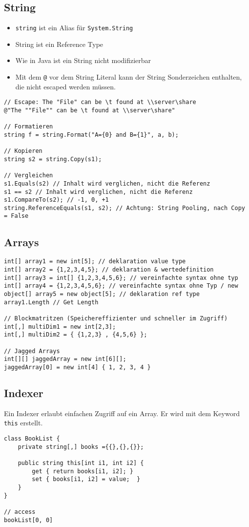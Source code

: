\subsection{String}
\begin{itemize}
	\item \lstinline|string| ist ein Alias für \lstinline|System.String|
	\item String ist ein Reference Type
	\item Wie in Java ist ein String nicht modifizierbar
	\item Mit dem \lstinline|@| vor dem String Literal kann der String Sonderzeichen enthalten, die nicht escaped werden müssen.
\end{itemize}
\begin{lstlisting}
// Escape: The "File" can be \t found at \\server\share
@"The ""File"" can be \t found at \\server\share"

// Formatieren
string f = string.Format("A={0} and B={1}", a, b);

// Kopieren
string s2 = string.Copy(s1);

// Vergleichen
s1.Equals(s2) // Inhalt wird verglichen, nicht die Referenz
s1 == s2 // Inhalt wird verglichen, nicht die Referenz
s1.CompareTo(s2); // -1, 0, +1 
string.ReferenceEquals(s1, s2); // Achtung: String Pooling, nach Copy = False
\end{lstlisting}

\clearpage

\subsection{Arrays}
\begin{lstlisting}
int[] array1 = new int[5]; // deklaration value type
int[] array2 = {1,2,3,4,5}; // deklaration & wertedefinition
int[] array3 = int[] {1,2,3,4,5,6}; // vereinfachte syntax ohne typ
int[] array4 = {1,2,3,4,5,6}; // vereinfachte syntax ohne Typ / new
object[] array5 = new object[5]; // deklaration ref type
array1.Length // Get Length

// Blockmatritzen (Speichereffizienter und schneller im Zugriff)
int[,] multiDim1 = new int[2,3];
int[,] multiDim2 = { {1,2,3} , {4,5,6} };

// Jagged Arrays
int[][] jaggedArray = new int[6][];
jaggedArray[0] = new int[4] { 1, 2, 3, 4 }
\end{lstlisting}

\subsection{Indexer}
Ein Indexer erlaubt einfachen Zugriff auf ein Array. Er wird mit dem Keyword \lstinline|this| erstellt.
\begin{lstlisting}
class BookList {
	private string[,] books ={{},{},{}};

	public string this[int i1, int i2] {
		get { return books[i1, i2]; }
		set { books[i1, i2] = value;  } 
	}
}

// access
bookList[0, 0]
\end{lstlisting}

